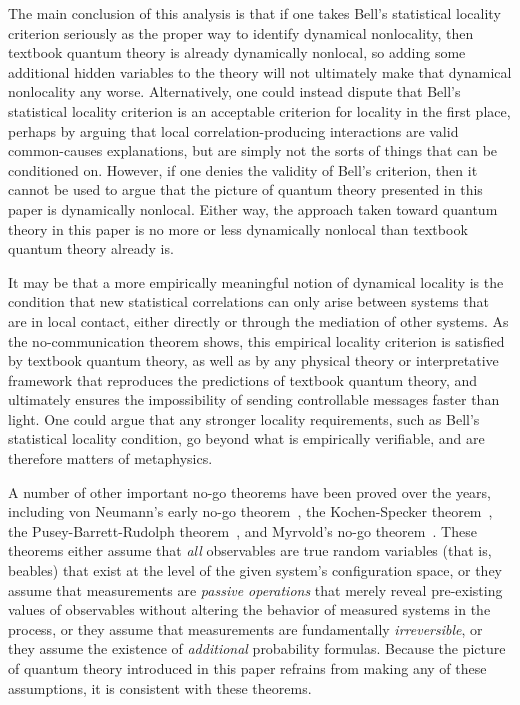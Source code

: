 \documentclass[12pt,english,prl,superscriptaddress,nobibnotes,nofootinbib]{revtex4-2}
\begin{document}
The main conclusion of this analysis is that if one takes Bell's statistical
locality criterion seriously as the proper way to identify dynamical
nonlocality, then textbook quantum theory is already dynamically nonlocal,
so adding some additional hidden variables to the theory will not
ultimately make that dynamical nonlocality any worse. Alternatively,
one could instead dispute that Bell's statistical locality criterion
is an acceptable criterion for locality in the first place, perhaps
by arguing that local correlation-producing interactions are valid
common-causes explanations, but are simply not the sorts of things
that can be conditioned on. However, if one denies the validity of
Bell's criterion, then it cannot be used to argue that the picture
of quantum theory presented in this paper is dynamically nonlocal.
Either way, the approach taken toward quantum theory in this paper
is no more or less dynamically nonlocal than textbook quantum theory
already is.

It may be that a more empirically meaningful notion of dynamical locality
is the condition that new statistical correlations can only arise
between systems that are in local contact, either directly or through
the mediation of other systems. As the no-communication theorem shows,
this empirical locality criterion is satisfied by textbook quantum
theory, as well as by any physical theory or interpretative framework
that reproduces the predictions of textbook quantum theory, and ultimately
ensures the impossibility of sending controllable messages faster
than light. One could argue that any stronger locality requirements,
such as Bell's statistical locality condition, go beyond what is empirically
verifiable, and are therefore matters of metaphysics.

A number of other important no-go theorems have been proved over the
years, including von Neumann's early no-go theorem~\citep{vonNeumann:1927wadq,vonNeumann:1932mgdq},
the Kochen-Specker theorem~\citep{KochenSpecker:1967phvqm}, the
Pusey-Barrett-Rudolph theorem~\citep{PuseyBarrettRudolph:2012rqs},
and Myrvold's no-go theorem~\citep{Myrvold:2002mir}. These theorems
either assume that \emph{all} observables are true random variables
(that is, beables) that exist at the level of the given system's configuration
space, or they assume that measurements are \emph{passive operations}
that merely reveal pre-existing values of observables without altering
the behavior of measured systems in the process, or they assume that
measurements are fundamentally \emph{irreversible}, or they assume
the existence of \emph{additional} probability formulas. Because the
picture of quantum theory introduced in this paper refrains from making
any of these assumptions, it is consistent with these theorems.
\end{document}
